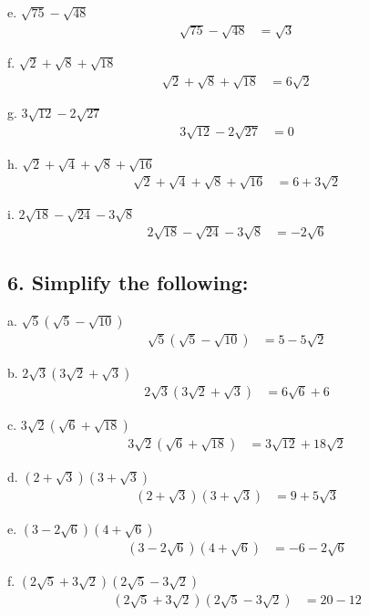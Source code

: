 \documentclass{article}
\begin{document}
e. $\sqrt{75}-\sqrt{48}$
\begin{align*}
    \sqrt{75}-\sqrt{48} &= \sqrt{3}
\end{align*}

f. $\sqrt{2}+\sqrt{8}+\sqrt{18}$
\begin{align*}
    \sqrt{2}+\sqrt{8}+\sqrt{18} &= 6\sqrt{2}
\end{align*}

g. $3 \sqrt{12}-2 \sqrt{27}$
\begin{align*}
    3 \sqrt{12}-2 \sqrt{27} &= 0
\end{align*}

h. $\sqrt{2}+\sqrt{4}+\sqrt{8}+\sqrt{16}$
\begin{align*}
    \sqrt{2}+\sqrt{4}+\sqrt{8}+\sqrt{16} &= 6+3\sqrt{2}
\end{align*}

i. $2 \sqrt{18}-\sqrt{24}-3 \sqrt{8}$
\begin{align*}
    2 \sqrt{18}-\sqrt{24}-3 \sqrt{8} &= -2\sqrt{6}
\end{align*}

\subsection*{6. Simplify the following:}

a. $\sqrt{5}(\sqrt{5}-\sqrt{10})$
\begin{align*}
    \sqrt{5}(\sqrt{5}-\sqrt{10}) &= 5-5\sqrt{2}
\end{align*}

b. $2 \sqrt{3}(3 \sqrt{2}+\sqrt{3})$
\begin{align*}
    2 \sqrt{3}(3 \sqrt{2}+\sqrt{3}) &= 6\sqrt{6}+6
\end{align*}

c. $3 \sqrt{2}(\sqrt{6}+\sqrt{18})$
\begin{align*}
    3 \sqrt{2}(\sqrt{6}+\sqrt{18}) &= 3\sqrt{12}+18\sqrt{2}
\end{align*}

d. $(2+\sqrt{3})(3+\sqrt{3})$
\begin{align*}
    (2+\sqrt{3})(3+\sqrt{3}) &= 9+5\sqrt{3}
\end{align*}

e. $(3-2 \sqrt{6})(4+\sqrt{6})$
\begin{align*}
    (3-2 \sqrt{6})(4+\sqrt{6}) &= -6-2\sqrt{6}
\end{align*}

f. $(2 \sqrt{5}+3 \sqrt{2})(2 \sqrt{5}-3 \sqrt{2})$
\begin{align*}
    (2 \sqrt{5}+3 \sqrt{2})(2 \sqrt{5}-3 \sqrt{2}) &= 20-12
\end{align*}
\newpage
\end{document}
